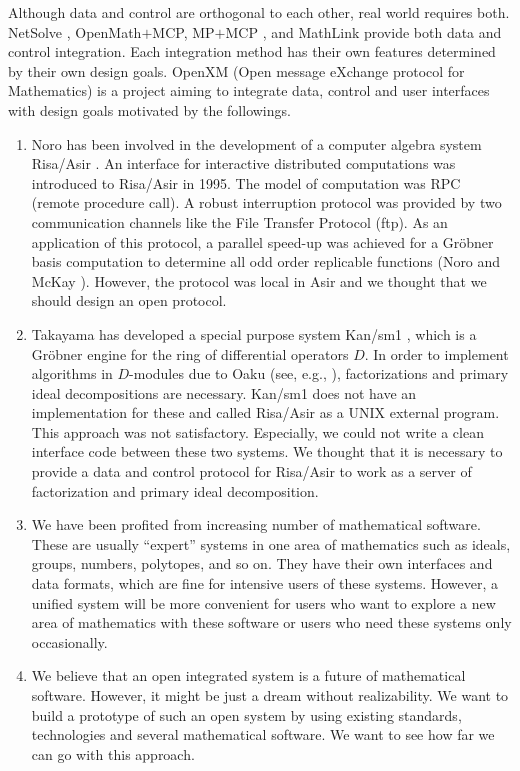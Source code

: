 Although data and control are orthogonal to each other,
real world requires both.
NetSolve \cite{netsolve}, OpenMath$+$MCP, MP$+$MCP \cite{iamc},
and MathLink \cite{mathlink} provide both data and control integration.
Each integration method has their own features determined by their
own design goals.
OpenXM (Open message eXchange protocol for Mathematics)
is a project aiming to integrate data, control and user interfaces
with design goals motivated by the followings.
\begin{enumerate}
\item Noro has been involved in the development of 
a computer algebra system Risa/Asir \cite{asir}.
An interface for interactive distributed computations was introduced
to Risa/Asir 
in 1995.
The model of computation was RPC (remote procedure call).
A robust interruption protocol was provided 
by  two communication channels
like the File Transfer Protocol (ftp).
As an application of this protocol,
a parallel speed-up was achieved for a Gr\"obner basis computation
to determine all odd order replicable functions 
(Noro and McKay \cite{noro-mckay}).
However, the protocol was local in Asir and we thought that we should
design an open protocol.
\item Takayama has developed
a special purpose system Kan/sm1 \cite{kan},
which is a Gr\"obner engine for the ring of differential operators $D$. 
In order to implement algorithms in $D$-modules due to Oaku 
(see, e.g., \cite{sst-book}),
factorizations and primary ideal decompositions are necessary.
Kan/sm1 does not have an implementation for these and called
Risa/Asir as a UNIX external program.
This approach was not satisfactory.
Especially, we could not write a clean interface code between these
two systems.
We thought that it is necessary to provide a data and control protocol
for Risa/Asir to work as a server of factorization and primary ideal
decomposition.
\item We have been profited from increasing number 
of mathematical software.
These are usually ``expert'' systems in one area of mathematics
such as ideals, groups, numbers, polytopes, and so on.
They have their own interfaces and data formats,
which are fine for intensive users of these systems.
However, a unified system will be more convenient
for users who want to explore a new area of mathematics with these
software or users who need these systems only occasionally.

\item  We believe that an open integrated system is a future of mathematical
software.
However, it might be just a dream without realizability.
We want to build a prototype of such an open system by using
existing standards, technologies and several mathematical software.
We want to see how far we can go with this approach.
\end{enumerate}

